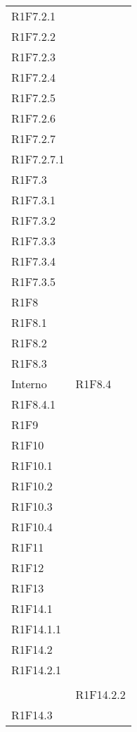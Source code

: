 \begin{longtable}{ >{\centering}p{}
			>{\centering}p{}}
		R1F7.2.1\\
		R1F7.2.2\\
		R1F7.2.3\\
		R1F7.2.4\\
		R1F7.2.5\\
		R1F7.2.6\\
		R1F7.2.7\\
		R1F7.2.7.1\\
		R1F7.3\\
		R1F7.3.1\\
		R1F7.3.2\\
		R1F7.3.3\\
		R1F7.3.4\\
		R1F7.3.5\\
		R1F8\\
		R1F8.1\\
		R1F8.2\\
		R1F8.3 \tabularnewline
		Interno	&
		R1F8.4\\
		R1F8.4.1\\
		R1F9\\
		R1F10\\
		R1F10.1\\
		R1F10.2\\
		R1F10.3\\
		R1F10.4\\
		R1F11\\
		R1F12\\
	
		R1F13\\
		R1F14.1\\
		R1F14.1.1\\
		R1F14.2\\
		R1F14.2.1
			\tabularnewline \rowcolordark
		&
			\tabularnewline 
		&
		R1F14.2.2\\
		R1F14.3\\
		

\end{longtable}
